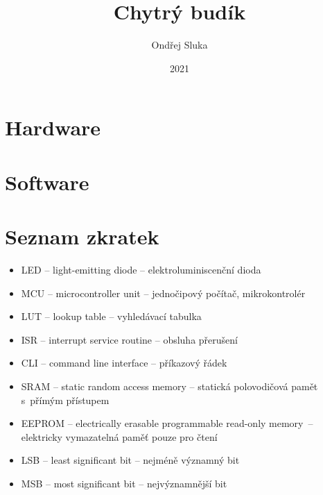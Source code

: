\documentclass[12pt,a4paper]{article}
\title{Chytrý budík}
\author{Ondřej Sluka}
\date{2021}  %
\begin{document}
\maketitle  %

\tableofcontents



\clearpage
\section{Hardware} %

%

\clearpage
\section{Software}  %


\printbibliography[title={Odkazy a~literatura}]  %


\section*{Seznam zkratek}
\begin{itemize}
    \item LED -- light-emitting diode -- elektroluminiscenční dioda
    \item MCU -- microcontroller unit -- jednočipový počítač, mikrokontrolér
    \item LUT -- lookup table -- vyhledávací tabulka
    \item ISR -- interrupt service routine -- obsluha přerušení
    \item CLI -- command line interface -- příkazový řádek
    \item SRAM -- static random access memory -- statická polovodičová pamět
          s~přímým přístupem
    \item EEPROM -- electrically erasable programmable read-only memory~--
          elektricky vymazatelná paměť pouze pro čtení
    \item LSB -- least significant bit -- nejméně významný bit
    \item MSB -- most significant bit -- nejvýznamnější bit
\end{itemize}
\end{document}
